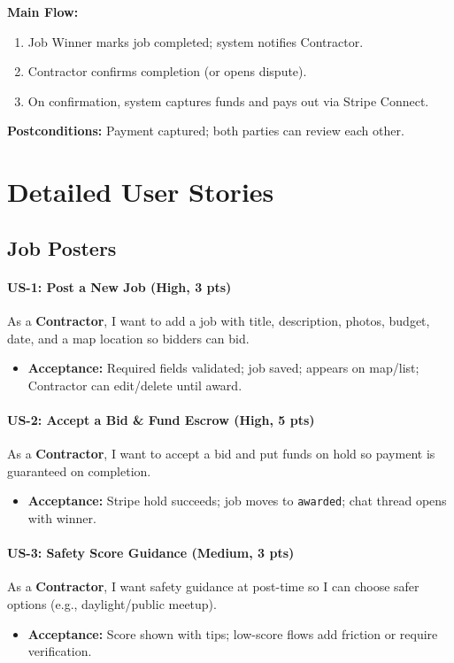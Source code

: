 \documentclass[11pt]{article}
\begin{document}
\textbf{Main Flow:}
\begin{enumerate}[leftmargin=1.4em]
  \item Job Winner marks job completed; system notifies Contractor.
  \item Contractor confirms completion (or opens dispute).
  \item On confirmation, system captures funds and pays out via Stripe Connect.
\end{enumerate}
\textbf{Postconditions:} Payment captured; both parties can review each other.


\section{Detailed User Stories}

\subsection*{Job Posters}
\paragraph{US-1: Post a New Job (High, 3 pts)}
As a \textbf{Contractor}, I want to add a job with title, description, photos, budget, date, and a map location so bidders can bid.
\begin{itemize}[leftmargin=1.4em]
  \item \textbf{Acceptance:} Required fields validated; job saved; appears on map/list; Contractor can edit/delete until award.
\end{itemize}

\paragraph{US-2: Accept a Bid \& Fund Escrow (High, 5 pts)}
As a \textbf{Contractor}, I want to accept a bid and put funds on hold so payment is guaranteed on completion.
\begin{itemize}[leftmargin=1.4em]
  \item \textbf{Acceptance:} Stripe hold succeeds; job moves to \texttt{awarded}; chat thread opens with winner.
\end{itemize}

\paragraph{US-3: Safety Score Guidance (Medium, 3 pts)}
As a \textbf{Contractor}, I want safety guidance at post-time so I can choose safer options (e.g., daylight/public meetup).
\begin{itemize}[leftmargin=1.4em]
  \item \textbf{Acceptance:} Score shown with tips; low-score flows add friction or require verification.
\end{itemize}
\end{document}
